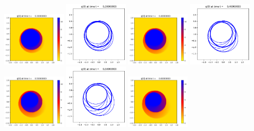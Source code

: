 \documentclass[11pt]{article}
\begin{document}
\includegraphics[width=0.2375\textwidth]{frame0003fig0.png}
\includegraphics[width=0.2375\textwidth]{frame0003fig1.png}
\vskip 10pt 
\includegraphics[width=0.2375\textwidth]{frame0004fig0.png}
\includegraphics[width=0.2375\textwidth]{frame0004fig1.png}
\includegraphics[width=0.2375\textwidth]{frame0005fig0.png}
\includegraphics[width=0.2375\textwidth]{frame0005fig1.png}
\vskip 10pt 
\includegraphics[width=0.2375\textwidth]{frame0006fig0.png}
\end{document}
